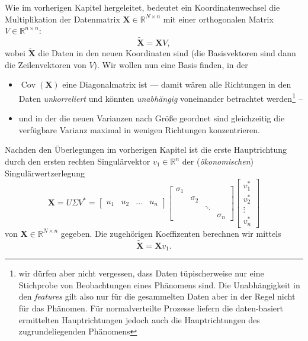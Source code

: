 \documentclass[]{book}
\providecommand{\tightlist}{%
  \setlength{\itemsep}{0pt}\setlength{\parskip}{0pt}}
\theoremstyle{definition}
\theoremstyle{definition}
\theoremstyle{definition}
\theoremstyle{definition}
\theoremstyle{remark}
\begin{document}
Wie im vorherigen Kapitel hergeleitet, bedeutet ein Koordinatenwechsel die Multiplikation der Datenmatrix \({\mathbf{X}}\in \mathbb R^{N\times n}\) mit einer orthogonalen
Matrix \(V\in \mathbb R^{n\times n}\):
\begin{equation*}
\tilde {\mathbf{X}}= {\mathbf{X}}V,
\end{equation*}
wobei \(\tilde {\mathbf{X}}\) die Daten in den neuen Koordinaten sind (die Basisvektoren sind dann die Zeilenvektoren von \(V\)). Wir wollen nun eine Basis finden, in der

\begin{itemize}
\tightlist
\item
  \(\operatorname{Cov}({\mathbf{X}})\) eine Diagonalmatrix ist --- damit wären alle Richtungen in den Daten \emph{unkorreliert} und könnten \emph{unabhängig} voneinander betrachtet werden\footnote{wir dürfen aber nicht vergessen, dass Daten tüpischerweise nur eine Stichprobe von Beobachtungen eines Phänomens sind. Die Unabhängigkeit in den \emph{features} gilt also nur für die gesammelten Daten aber in der Regel nicht für das Phänomen. Für normalverteilte Prozesse liefern die daten-basiert ermittelten Hauptrichtungen jedoch auch die Hauptrichtungen des zugrundeliegenden Phänomens} --
\item
  und in der die neuen Varianzen nach Größe geordnet sind gleichzeitig die verfügbare Varianz maximal in wenigen Richtungen konzentrieren.
\end{itemize}

Nachden den Überlegungen im vorherigen Kapitel ist die erste Hauptrichtung durch den ersten rechten Singulärvektor \(v_1\in \mathbb R^{n}\) der (\emph{ökonomischen}) Singulärwertzerlegung
\begin{equation*}
{\mathbf{X}}= U\Sigma V^* = 
\begin{bmatrix}
u_1 & u_2 & \dots & u_n
\end{bmatrix}
\begin{bmatrix}
\sigma_1 \\ &\sigma_2 \\ &&\ddots \\ &&&\sigma_n
\end{bmatrix}
\begin{bmatrix}
v_1^* \\ v_2 ^* \\ \vdots \\ v_n^*
\end{bmatrix}
\end{equation*}
von \(\mathbf X\in \mathbb R^{N\times n}\) gegeben. Die zugehörigen Koeffizenten berechnen wir mittels
\begin{equation*}
\tilde {\mathbf{X}}= {\mathbf{X}}v_1.
\end{equation*}
\end{document}
